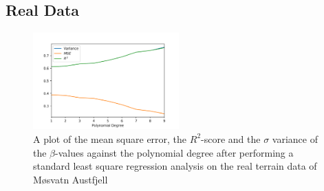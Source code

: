 \documentclass[a4paper,10pt,english]{article}
\begin{document}





%






\subsection{Real Data}



\begin{figure}[H]
	\centering 
	\includegraphics[width = 0.5\textwidth, center]{../real_output/part_A.png}
	\caption{
		A plot of the mean square error, the $R^2$-score and the $\sigma$ variance of the $\beta$-values against the polynomial degree after performing a standard least square regression analysis on the real terrain data of Møsvatn Austfjell
	}
	\label{part_g_a}
\end{figure}
\end{document}
